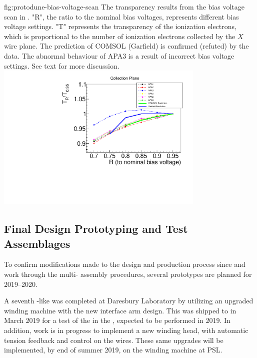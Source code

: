 \begin{dunefigure}{fig:protodune-bias-voltage-scan}
{The transparency results from the bias voltage scan in . "R", the ratio to the nominal bias voltages, represents different bias voltage settings. "T" represents the transparency of the ionization electrons, which is proportional to the number of ionization electrons collected by the $X$ wire plane. The prediction of COMSOL (Garfield) is confirmed (refuted) by the  data. The abnormal behaviour of APA3 is a result of incorrect bias voltage settings. See text for more discussion.}
\includegraphics[width=0.75\textwidth]{graphics/protodune-bias_voltage_scan_group1.pdf}   
\end{dunefigure}


\subsection{Final Design Prototyping and Test Assemblages}
\label{sec:fdsp-apa-qa-prototyping}


To confirm modifications made to the  design and production process since  and work through the multi- assembly procedures, several prototypes are planned for 2019--2020.

A seventh -like  was completed at Daresbury Laboratory by utilizing an upgraded winding machine with the new interface arm design. This  was shipped to  in March 2019 for a test of the  in the \coldbox, expected to be performed in 2019. In addition, work is in progress to implement a new winding head, with automatic tension feedback and control on the wires. These same upgrades will be implemented, by end of summer 2019, on the winding machine at PSL. %

